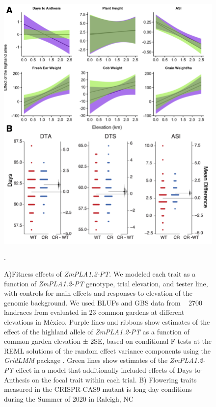 \documentclass[9pt,twocolumn,twoside,lineno]{BioRxiv}
\begin{document}
\begin{figure}[!h]
\begin{center}
\includegraphics[width=0.4\paperwidth]{Figures/Fig_6.png}
\caption{A)Fitness effects of \textit{ZmPLA1.2-PT}. 
We modeled each trait as a function of \textit{ZmPLA1.2-PT} genotype, trial elevation, and tester line, with controls for main effects and responses to elevation of the genomic background. 
We used BLUPs and GBS data from ~ 2700 landraces from \cite{Gates2019-xu} evaluated in 23 common gardens at different elevations in México. 
Purple lines and ribbons show estimates of the effect of the highland allele of \textit{ZmPLA1.2-PT} as a function of common garden elevation ± 2SE, based on conditional F-tests at the REML solutions of the random effect variance components using the \textit{GridLMM} package \cite{Runcie2019-Gr}. 
Green lines show estimates of the \textit{ZmPLA1.2-PT} effect in a model that additionally included effects of Days-to-Anthesis on the focal trait within each trial.
B) Flowering traits measured in the CRISPR-CAS9 mutant is long day conditions during the Summer of 2020 in Raleigh, NC}. 
\label{Fig6}
\end{center}
\end{figure}
\end{document}
